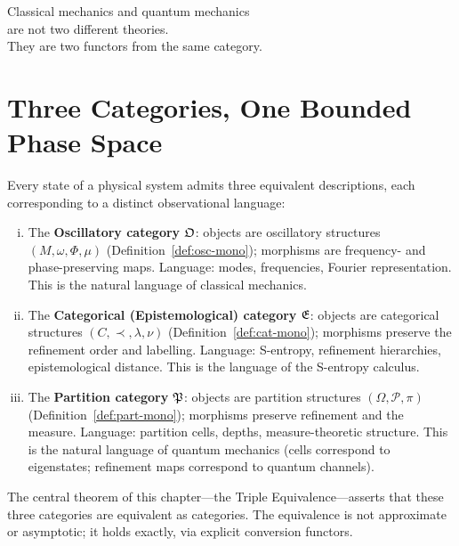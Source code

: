 
\epigraph{%
  Classical mechanics and quantum mechanics\\
  are not two different theories.\\
  They are two functors from the same category.%
}{}

\section{Three Categories, One Bounded Phase Space}
\label{sec:ch15-three}

Every state of a physical system admits three equivalent descriptions,
each corresponding to a distinct observational language:

\begin{enumerate}[(i)]
  \item The \textbf{Oscillatory category} $\mathfrak{O}$: objects are oscillatory
    structures $(M, \omega, \Phi, \mu)$ (Definition~\ref{def:osc-mono});
    morphisms are frequency- and phase-preserving maps.  Language: modes,
    frequencies, Fourier representation.  This is the natural language of
    classical mechanics.

  \item The \textbf{Categorical (Epistemological) category} $\mathfrak{E}$: objects are
    categorical structures $(C, \prec, \lambda, \nu)$
    (Definition~\ref{def:cat-mono}); morphisms preserve the refinement order
    and labelling.  Language: S-entropy, refinement hierarchies,
    epistemological distance.  This is the language of the S-entropy calculus.

  \item The \textbf{Partition category} $\mathfrak{P}$: objects are partition
    structures $(\Omega, \mathscr{P}, \pi)$ (Definition~\ref{def:part-mono});
    morphisms preserve refinement and the measure.  Language: partition cells,
    depths, measure-theoretic structure.  This is the natural language of
    quantum mechanics (cells correspond to eigenstates; refinement maps
    correspond to quantum channels).
\end{enumerate}

The central theorem of this chapter---the Triple Equivalence---asserts that
these three categories are equivalent as categories.  The equivalence is not
approximate or asymptotic; it holds exactly, via explicit conversion functors.

